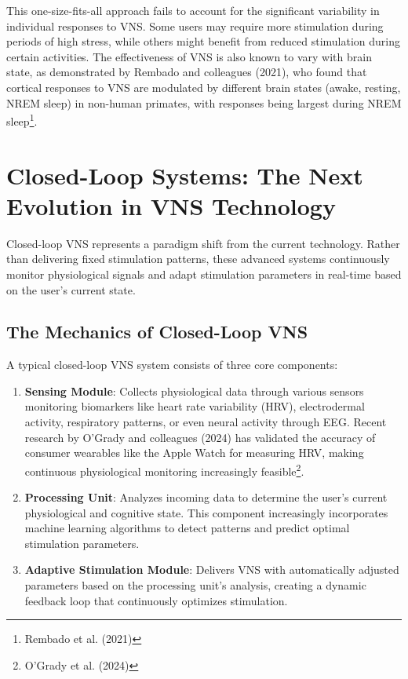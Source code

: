 \documentclass[
  Letterpaper,
]{scrbook}
\begin{document}
This one-size-fits-all approach fails to account for the significant
variability in individual responses to VNS. Some users may require more
stimulation during periods of high stress, while others might benefit
from reduced stimulation during certain activities. The effectiveness of
VNS is also known to vary with brain state, as demonstrated by Rembado
and colleagues (2021), who found that cortical responses to VNS are
modulated by different brain states (awake, resting, NREM sleep) in
non-human primates, with responses being largest during NREM
sleep\footnote{Rembado et al. (2021)}.

\section{Closed-Loop Systems: The Next Evolution in VNS
Technology}\label{closed-loop-systems-the-next-evolution-in-vns-technology}

Closed-loop VNS represents a paradigm shift from the current technology.
Rather than delivering fixed stimulation patterns, these advanced
systems continuously monitor physiological signals and adapt stimulation
parameters in real-time based on the user's current state.

\subsection{The Mechanics of Closed-Loop
VNS}\label{the-mechanics-of-closed-loop-vns}

A typical closed-loop VNS system consists of three core components:

\begin{enumerate}
\def\labelenumi{\arabic{enumi}.}
\item
  \textbf{Sensing Module}: Collects physiological data through various
  sensors monitoring biomarkers like heart rate variability (HRV),
  electrodermal activity, respiratory patterns, or even neural activity
  through EEG. Recent research by O'Grady and colleagues (2024) has
  validated the accuracy of consumer wearables like the Apple Watch for
  measuring HRV, making continuous physiological monitoring increasingly
  feasible\footnote{O'Grady et al. (2024)}.
\item
  \textbf{Processing Unit}: Analyzes incoming data to determine the
  user's current physiological and cognitive state. This component
  increasingly incorporates machine learning algorithms to detect
  patterns and predict optimal stimulation parameters.
\item
  \textbf{Adaptive Stimulation Module}: Delivers VNS with automatically
  adjusted parameters based on the processing unit's analysis, creating
  a dynamic feedback loop that continuously optimizes stimulation.
\end{enumerate}
\end{document}
